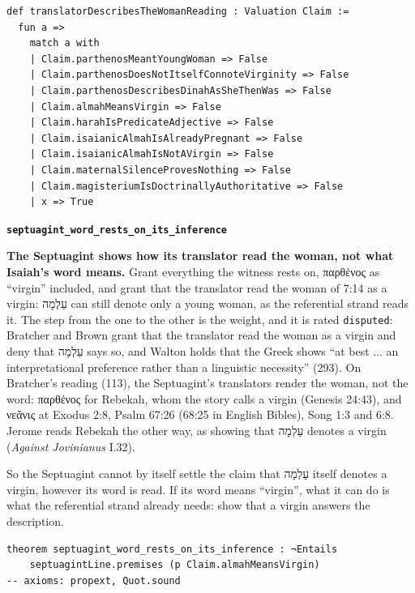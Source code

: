 \documentclass[11pt]{article}
\begin{document}
{\small\begin{verbatim}
def translatorDescribesTheWomanReading : Valuation Claim :=
  fun a =>
    match a with
    | Claim.parthenosMeantYoungWoman => False
    | Claim.parthenosDoesNotItselfConnoteVirginity => False
    | Claim.parthenosDescribesDinahAsSheThenWas => False
    | Claim.almahMeansVirgin => False
    | Claim.harahIsPredicateAdjective => False
    | Claim.isaianicAlmahIsAlreadyPregnant => False
    | Claim.isaianicAlmahIsNotAVirgin => False
    | Claim.maternalSilenceProvesNothing => False
    | Claim.magisteriumIsDoctrinallyAuthoritative => False
    | x => True
\end{verbatim}}
\par\medskip\noindent\textbf{\texttt{septuagint\_\allowbreak{}word\_\allowbreak{}rests\_\allowbreak{}on\_\allowbreak{}its\_\allowbreak{}inference}}\par\nobreak\noindent
\textbf{The Septuagint shows how its translator read the woman, not what Isaiah’s word means.} Grant everything the witness rests on, παρθένος as “virgin” included, and grant that the translator read the woman of 7:14 as a virgin: עַלְמָה can still denote only a young woman, as the referential strand reads it. The step from the one to the other is the weight, and it is rated \texttt{disputed}: Bratcher and Brown grant that the translator read the woman as a virgin and deny that עַלְמָה says so, and Walton holds that the Greek shows “at best ... an interpretational preference rather than a linguistic necessity” (293). On Bratcher’s reading (113), the Septuagint’s translators render the woman, not the word: παρθένος for Rebekah, whom the story calls a virgin (Genesis 24:43), and νεᾶνις at Exodus 2:8, Psalm 67:26 (68:25 in English Bibles), Song 1:3 and 6:8. Jerome reads Rebekah the other way, as showing that עַלְמָה denotes a virgin (\emph{Against Jovinianus} I.32).

So the Septuagint cannot by itself settle the claim that עַלְמָה itself denotes a virgin, however its word is read. If its word means “virgin”, what it can do is what the referential strand already needs: show that a virgin answers the description.

{\small\begin{verbatim}
theorem septuagint_word_rests_on_its_inference : ¬Entails
    septuagintLine.premises (p Claim.almahMeansVirgin)
-- axioms: propext, Quot.sound
\end{verbatim}}
\end{document}
